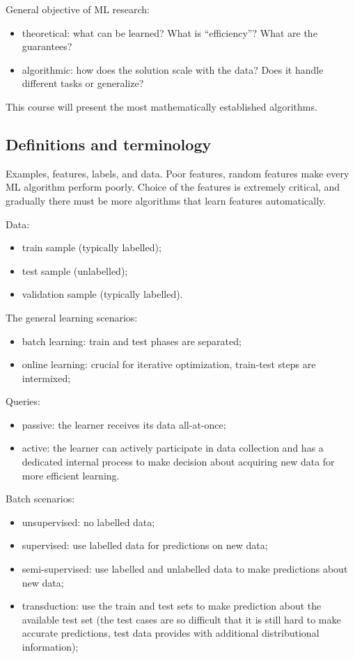 \documentclass[a4paper]{article}
\begin{document}
General objective of ML research: \begin{itemize}
	\item theoretical: what can be learned? What is ``efficiency''? What are the
	guarantees?
	\item algorithmic: how does the solution scale with the data? Does it handle
	different tasks or generalize?
\end{itemize}

This course will present the most mathematically established algorithms.


\subsection{Definitions and terminology} %
\label{sub:definitions_and_terminology}

Examples, features, labels, and data. Poor features, random features make every
ML algorithm perform poorly. Choice of the features is extremely critical, and
gradually there must be more algorithms that learn features automatically.

Data: \begin{itemize}
	\item train sample (typically labelled);
	\item test sample (unlabelled);
	\item validation sample (typically labelled).
\end{itemize}

The general learning scenarios: \begin{itemize}
	\item batch learning: train and test phases are separated;
	\item online learning: crucial for iterative optimization, train-test steps
	are intermixed;
\end{itemize}

Queries: \begin{itemize}
	\item passive: the learner receives its data all-at-once;
	\item active: the learner can actively participate in data collection and has
	a dedicated internal process to make decision about acquiring new data for more
	efficient learning.
\end{itemize}

Batch scenarios: \begin{itemize}
	\item unsupervised: no labelled data;
	\item supervised: use labelled data for predictions on new data;
	\item semi-supervised: use labelled and unlabelled data to make predictions
	about new data;
	\item transduction: use the train and test sets to make prediction about the
	available test set (the test cases are so difficult that it is still hard to
	make accurate predictions, test data provides with additional distributional
	information);
\end{itemize}
\end{document}
